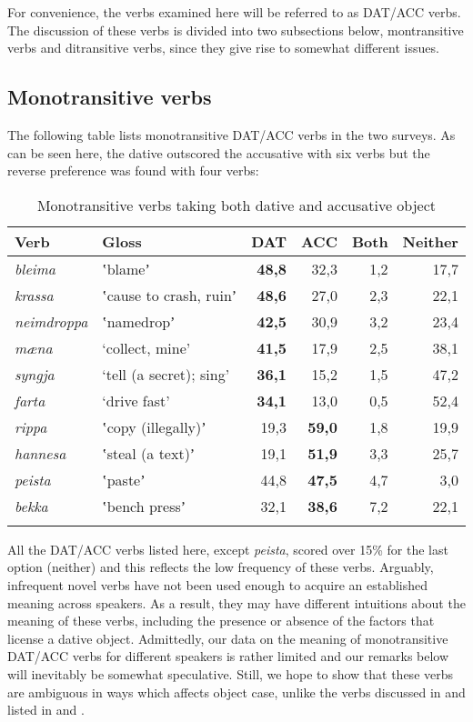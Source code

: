 \documentclass[output=paper,modfonts,nonflat,colorlinks,citecolor=brown]{langsci/langscibook}
\begin{document}
For convenience, the verbs examined here will be referred to as DAT/ACC verbs. The discussion of these verbs is divided into two subsections below, montransitive verbs and ditransitive verbs, since they give rise to somewhat different issues.

\subsection{Monotransitive verbs} %
\label{sec:jonsson:4.1}

The following table lists monotransitive DAT/ACC verbs in the two surveys. As can be seen here, the dative outscored the accusative with six verbs but the reverse preference was found with four verbs:

\begin{table}
{\caption{\label{tab:jonsson:4}Monotransitive verbs taking both dative and accusative object} }
\begin{tabularx}{\textwidth}{XXrrrr}
\lsptoprule
Verb & Gloss & \textbf{DAT} & ACC & Both & Neither\\
\midrule
\textit{bleima} & ʽblameʼ & \textbf{48,8} & 32,3 & 1,2 & 17,7\\
\textit{krassa} & ʽcause to crash, ruinʼ & \textbf{48,6} & 27,0 & 2,3 & 22,1\\
\textit{neimdroppa} & ʽnamedropʼ & \textbf{42,5} & 30,9 & 3,2 & 23,4\\
\textit{mæna} & ‘collect, mine’ & \textbf{41,5} & 17,9 & 2,5 & 38,1\\
\textit{syngja} & ‘tell (a secret); sing’ & \textbf{36,1} & 15,2 & 1,5 & 47,2\\
\textit{farta} & ‘drive fast’ & \textbf{34,1} & 13,0 & 0,5 & 52,4\\
\textit{rippa} & ʽcopy (illegally)ʼ & 19,3 & \textbf{59,0} & 1,8 & 19,9\\
\textit{hannesa} & ʽsteal (a text)ʼ & 19,1 & \textbf{51,9} & 3,3 & 25,7\\
\textit{peista} & ʽpasteʼ & 44,8 & \textbf{47,5} & 4,7 & 3,0\\
\textit{bekka} & ʽbench pressʼ & 32,1 & \textbf{38,6} & 7,2 & 22,1\\
\lspbottomrule
\end{tabularx}
\end{table}

All the DAT/ACC verbs listed here, except \textit{peista}, scored over 15\% for the last option (neither) and this reflects the low frequency of these verbs. Arguably, infrequent novel verbs have not been used enough to acquire an established meaning across speakers. As a result, they may have different intuitions about the meaning of these verbs, including the presence or absence of the factors that license a dative object. Admittedly, our data on the meaning of monotransitive DAT/ACC verbs for different speakers is rather limited and our remarks below will inevitably be somewhat speculative. Still, we hope to show that these verbs are ambiguous in ways which affects object case, unlike the verbs discussed in  and listed in  and .
\end{document}
